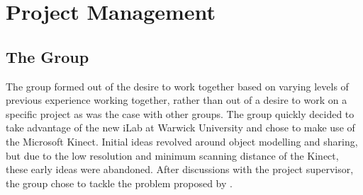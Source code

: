 \chapter{Project Management}
\label{project management}

\section{The Group}
The group formed out of the desire to work together based on varying levels of previous experience working together, rather than out of a desire to work on a specific project as was the case with other groups.
The group quickly decided to take advantage of the new iLab at Warwick University \cite{Kalvala2013} and chose to make use of the Microsoft Kinect.
Initial ideas revolved around object modelling and sharing, but due to the low resolution and minimum scanning distance of the Kinect, these early ideas were abandoned.
After discussions with the project supervisor, the group chose to tackle the problem proposed by .\\

